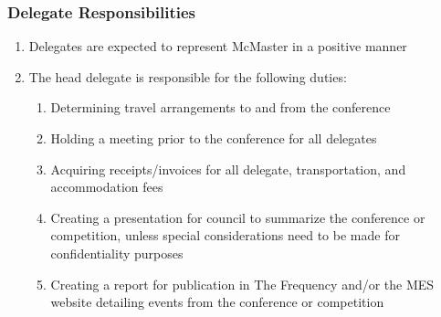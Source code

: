 \hypertarget{delegate-responsibilities}{%
 \subsubsection{Delegate
  Responsibilities}
 \label{delegate-responsibilities}}
\begin{enumerate}
 \item
  Delegates are expected to represent McMaster in a positive manner
 \item
  The head delegate is responsible for the following duties:

  \begin{enumerate}
   \item
    Determining travel arrangements to and from the conference
   \item
    Holding a meeting prior to the conference for all delegates
   \item
    Acquiring receipts/invoices for all delegate, transportation, and
    accommodation fees
   \item
    Creating a presentation for council to summarize the conference or
    competition, unless special considerations need to be made for
    confidentiality purposes
   \item
    Creating a report for publication in The Frequency and/or the MES
    website detailing events from the conference or competition

  \end{enumerate}
\end{enumerate}

